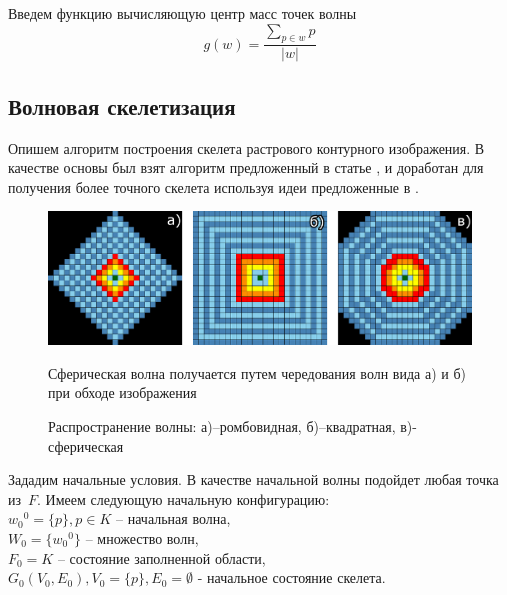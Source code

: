 Введем функцию вычисляющую центр масс точек волны 
$$g(w)=\dfrac{\sum\limits_{p\in w} p}{\lvert w\rvert}$$

\subsection{Волновая скелетизация}
Опишем алгоритм построения скелета растрового контурного изображения. В качестве основы был взят алгоритм предложенный в статье \cite{ocrai}, и доработан для получения более точного скелета используя идеи предложенные в \cite{topology_skeleton}.

\begin{figure}[h]
\centering
\includegraphics[width=\linewidth,keepaspectratio]{images/th_wave}
\caption{Распространение волны: а)--ромбовидная, б)--квадратная, в)-сферическая }
\medskip
\small
Сферическая волна получается путем чередования волн вида а) и б) при обходе изображения
\end{figure}

Зададим начальные условия. В качестве начальной волны подойдет любая точка из~$F$. 
Имеем следующую начальную конфигурацию:\\
${{w_0}^0} = \{p\}, p\in K$ -- начальная волна,\\
$W_0 = \{{w_0}^0\}$  -- множество волн,\\
$F_0 = K$ -- состояние заполненной области,\\
$G_0(V_0,E_0), V_0=\{p\}, E_0=\emptyset$ - начальное состояние скелета.\\


